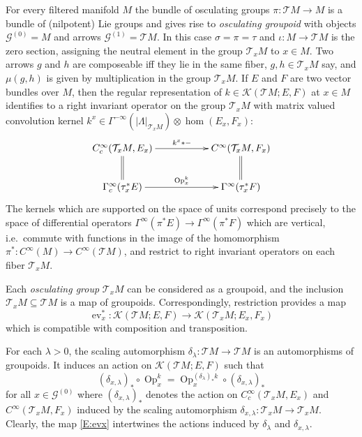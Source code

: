 \documentclass[reqno,12pt]{amsart}
\DeclareMathOperator{\Op}{Op}
\DeclareMathOperator{\ev}{ev}
\theoremstyle{plain}
\theoremstyle{definition}
\begin{document}
For every filtered manifold $M$ the bundle of osculating groups $\pi\colon\mathcal TM\to M$ is a bundle of (nilpotent) Lie groups and gives rise to \emph{osculating groupoid} with objects $\mathcal G^{(0)}=M$ and arrows $\mathcal G^{(1)}=\mathcal TM$.
In this case $\sigma=\pi=\tau$ and $\iota\colon M\to\mathcal TM$ is the zero section, assigning the neutral element in the group $\mathcal T_xM$ to $x\in M$.
Two arrows $g$ and $h$ are composeable iff they lie in the same fiber, $g,h\in\mathcal T_xM$ say, and $\mu(g,h)$ is given by multiplication in the group $\mathcal T_xM$.
If $E$ and $F$ are two vector bundles over $M$, then the regular representation of $k\in\mathcal K(\mathcal TM;E,F)$ at $x\in M$ identifies to a right invariant operator on the group $\mathcal T_xM$ with matrix valued convolution kernel $k^x\in\Gamma^{-\infty}(|\Lambda|_{\mathcal T_xM})\otimes\hom(E_x,F_x)$:
\begin{equation}
\vcenter{
\xymatrix{
C^\infty_c(\mathcal T_xM,E_x)\ar[rr]^-{k^x*-}\ar@{=}[d]
&&C^\infty(\mathcal T_xM,F_x)\ar@{=}[d]
\\
\Gamma_c^\infty(\tau_x^*E)\ar[rr]^-{\Op^k_x}
&&\Gamma^\infty(\tau_x^*F)
}}
\end{equation}
The kernels which are supported on the space of units correspond precisely to the space of differential operators $\Gamma^\infty(\pi^*E)\to\Gamma^\infty(\pi^*F)$ which are vertical, i.e.\ commute with functions in the image of the homomorphism $\pi^*\colon C^\infty(M)\to C^\infty(\mathcal TM)$, and restrict to right invariant operators on each fiber $\mathcal T_xM$.


Each \emph{osculating group} $\mathcal T_xM$ can be considered as a groupoid, and the inclusion $\mathcal T_xM\subseteq\mathcal TM$ is a map of groupoids.
Correspondingly, restriction provides a map
\begin{equation}\label{E:evx}
\ev_x^*\colon\mathcal K(\mathcal TM;E,F)\to\mathcal K(\mathcal T_xM;E_x,F_x)
\end{equation}
which is compatible with composition and transposition.


For each $\lambda>0$, the scaling automorphism $\delta_\lambda\colon\mathcal TM\to\mathcal TM$ is an automorphisms of groupoids.
It induces an action on $\mathcal K(\mathcal TM;E,F)$ such that 
$$
(\delta_{x,\lambda})_*\circ\Op^k_x
=\Op^{(\delta_\lambda)_*k}_x\circ(\delta_{x,\lambda})_*
$$
for all $x\in\mathcal G^{(0)}$ where $(\delta_{x,\lambda})_*$ denotes the action on $C^\infty_c(\mathcal T_xM,E_x)$ and $C^\infty(\mathcal T_xM,F_x)$ induced by the scaling automorphism $\delta_{x,\lambda}\colon\mathcal T_xM\to\mathcal T_xM$.
Clearly, the map \eqref{E:evx} intertwines the actions induced by $\delta_\lambda$ and $\delta_{x,\lambda}$.
\end{document}
